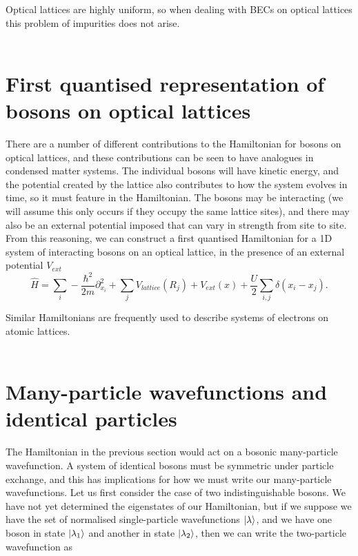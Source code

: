 \documentclass[a4paper,10pt]{article}
\begin{document}
Optical lattices are highly uniform, so when dealing with BECs on optical lattices this problem of impurities does not arise.
\\\\



\section{First quantised representation of bosons on optical lattices}
There are a number of different contributions to the Hamiltonian for bosons on optical lattices, and these contributions can be seen to have analogues in condensed matter systems.
The individual bosons will have kinetic energy, and the potential created by the lattice also contributes to how the system evolves in time, so it must feature in the Hamiltonian.
The bosons may be interacting (we will assume this only occurs if they occupy the same lattice sites), and there may also be an external potential  imposed that can vary in strength
from site to site. From this reasoning, we can construct a first quantised Hamiltonian for a 1D system of interacting bosons on an optical lattice, in the presence of an external potential $V_{ext}$
\begin{equation}
 \hat{H}=\sum_{i}-\frac{\hbar^{2}}{2m}  \partial_{x_{i}}^2+\sum_{j}V_{lattice}(R_{j})+V_{ext}(x)+\frac{U}{2}\sum_{i,j}\delta(x_{i}-x_{j}).
\end{equation}

Similar Hamiltonians are frequently used to describe systems of electrons on atomic lattices.
\\\\

\section{Many-particle wavefunctions and identical particles \cite{Negele1988, Inkson1984, Altland2010}}
The Hamiltonian in the previous section would act on a bosonic many-particle wavefunction. A system of identical bosons must be symmetric under particle exchange, and this has 
implications for how we must write our many-particle wavefunctions. Let us first consider the case of two indistinguishable bosons. We have not yet determined the eigenstates 
of our Hamiltonian, but if we suppose we have the set of normalised single-particle wavefunctions $\ket{\lambda}$, and we have one boson in state $\ket{\lambda_1}$ and another
in state $\ket{\lambda_2}$, then we can write the two-particle wavefunction as
\end{document}
